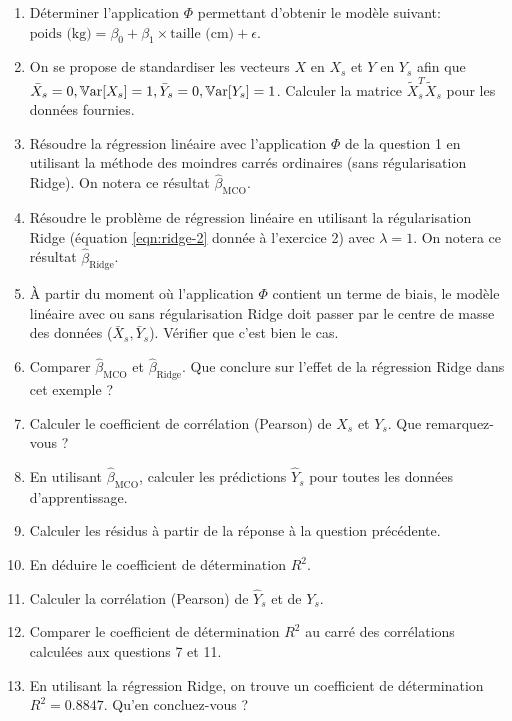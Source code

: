 \documentclass[solutions]{../exercices}
\begin{document}
\begin{exercice}
\begin{enumerate}
	\item Déterminer l'application $\Phi$ permettant d'obtenir le modèle suivant: $\text{poids (kg)} = \beta_0 + \beta_1 \times \text{taille (cm)} + \epsilon$.
	\item On se propose de standardiser les vecteurs $X$ en $X_s$ et $Y$ en $Y_s$ afin que $\bar{X}_s = 0, \mathbb{V}\mathrm{ar}{[X_s]} = 1, \bar{Y}_s = 0, \mathbb{V}\mathrm{ar}{[Y_s]} = 1$. Calculer la matrice $\tilde{X}_s^T\tilde{X}_s$ pour les données fournies.
	\item Résoudre la régression linéaire avec l'application $\Phi$ de la question 1 en utilisant la méthode des moindres carrés ordinaires (sans régularisation Ridge). On notera ce résultat $\hat{\beta}_{\text{MCO}}$.
	\item Résoudre le problème de régression linéaire en utilisant la régularisation Ridge (équation \ref{eqn:ridge-2} donnée à l'exercice 2) avec $\lambda = 1$. On notera ce résultat $\hat{\beta}_{\text{Ridge}}$.
	\item \`A partir du moment où l'application $\Phi$ contient un terme de biais, le modèle linéaire avec ou sans régularisation Ridge doit passer par le centre de masse des données ($\bar{X}_s, \bar{Y}_s$). Vérifier que c'est bien le cas.
	\item Comparer $\hat{\beta}_{\text{MCO}}$ et $\hat{\beta}_{\text{Ridge}}$. Que conclure sur l'effet de la régression Ridge dans cet exemple ?
	\item Calculer le coefficient de corrélation (Pearson) de $X_s$ et $Y_s$. Que remarquez-vous ?
	\item En utilisant $\hat{\beta}_{\text{MCO}}$, calculer les prédictions $\hat{Y}_s$ pour toutes les données d'apprentissage.
	\item Calculer les résidus à partir de la réponse à la question précédente.
	\item En déduire le coefficient de détermination $R^2$.
	\item Calculer la corrélation (Pearson) de $\hat{Y}_s$ et de $Y_s$.
	\item Comparer le coefficient de détermination $R^2$ au carré des corrélations calculées aux questions 7 et 11.
	\item En utilisant la régression Ridge, on trouve un coefficient de détermination $R^2 = 0.8847$. Qu'en concluez-vous ?
\end{enumerate}

\end{exercice}
\end{document}
